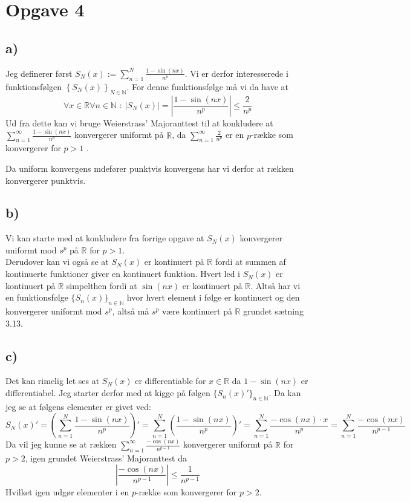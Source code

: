 \documentclass{article}
\newcommand{\m}[1]{\mathbb{#1}}
\newcommand{\mR}{\m{R}}
\newcommand{\mN}{\m{N}}
\newcommand{\abs}[1]{\left| #1\right|}
\newcommand{\lr}[1]{\left( #1\right)}
\newcommand{\lrc}[1]{\left\{ #1\right\}}
\begin{document}
\section*{Opgave 4}
\subsection*{a)}
Jeg definerer først $S_N(x) := \sum_{n=1}^N \frac{1 - \sin(nx)}{n^p}$.
Vi er derfor interesserede i funktionsfølgen $\lrc{S_N(x)}_{N \in \mN}$.
For denne funktionsfølge må vi da have at 
\[
    \forall x \in \mR \forall n \in \mN \text{ : } |S_N(x)| = \abs{\frac{1-\sin(nx)}{n^p}} \le \frac{2}{n^p}
\]
Ud fra dette kan vi bruge Weierstrass' Majoranttest\cite[sætning 3.24]{an1} til at konkludere at 
$\sum_{n=1}^{\infty} \frac{1 - \sin(nx)}{n^p}$ konvergerer uniformt på $\mR$, 
da $\sum_{n=1}^{\infty} \frac{2}{n^p}$ er en $p$-række som konvergerer for $p>1$ \cite[eksempel 2.23]{an1}.

Da uniform konvergens mdefører punktvis konvergens har vi derfor at rækken konvergerer punktvis.


\subsection*{b)}
Vi kan starte med at konkludere fra forrige opgave at $S_N(x)$ konvergerer uniformt mod $s^p$ på $\mR$ for $p > 1$. \\
Derudover kan vi også se at $S_N(x)$ er kontinuert på $\mR$ fordi at 
summen af kontinuerte funktioner giver en kontinuert funktion. Hvert led i
$S_N(x)$ er kontinuert på $\mR$ simpelthen fordi at $\sin(nx)$ er kontinuert på $\mR$.
Altså har vi en funktionsfølge $\{S_n(x)\}_{n \in \mN}$ hvor hvert element i følge er kontinuert
og den konvergerer uniformt mod $s^p$, altså må $s^p$ være kontinuert på $\mR$ grundet sætning 3.13\cite{an1}.

\subsection*{c)}
Det kan rimelig let ses at $S_N(x)$ er differentiable for $x \in \mR$ da $1-\sin(nx)$ er differentiabel.
Jeg starter derfor med at kigge på følgen $\{S_n(x)'\}_{n \in \mN}$.
Da kan jeg se at følgens elementer er givet ved:
\[
    S_N(x)' = \lr{\sum_{n=1}^{N} \frac{1-\sin(nx)}{n^p}}' 
    = \sum_{n=1}^{N} \lr{\frac{1-\sin(nx)}{n^p}}'
    = \sum_{n=1}^{N} \frac{-\cos(nx)\cdot x}{n^p}
    = \sum_{n=1}^{N} \frac{-\cos(nx)}{n^{p-1}}
\]
Da vil jeg kunne se at rækken $\sum_{n=1}^{\infty} \frac{-\cos(nx)}{n^{p-1}}$ konvergerer uniformt på $\mR$ for $p>2$,
igen grundet Weierstrass' Majoranttest\cite[sætning 3.24]{an1} da 
\[
    \abs{\frac{-\cos(nx)}{n^{p-1}}} \le \frac{1}{n^{p-1}}
\]
Hvilket igen udgør elementer i en $p$-række som konvergerer for $p>2$.
\end{document}
